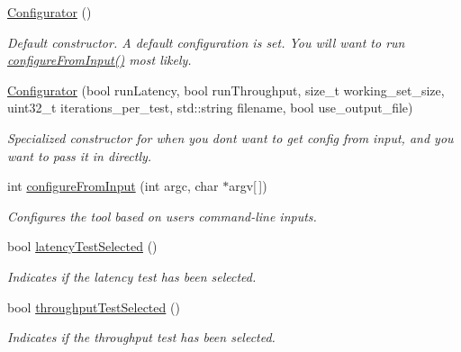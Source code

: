 \begin{DoxyCompactItemize}
\item 
\hypertarget{classxmem_1_1config_1_1_configurator_a8ae41e8976253affae2b905cb7ca2389}{}\hyperlink{classxmem_1_1config_1_1_configurator_a8ae41e8976253affae2b905cb7ca2389}{Configurator} ()\label{classxmem_1_1config_1_1_configurator_a8ae41e8976253affae2b905cb7ca2389}

\begin{DoxyCompactList}\small\item\em Default constructor. A default configuration is set. You will want to run \hyperlink{classxmem_1_1config_1_1_configurator_acd25216c6c3db19dd68a5f2ec9b0a061}{configure\+From\+Input()} most likely. \end{DoxyCompactList}\item 
\hyperlink{classxmem_1_1config_1_1_configurator_ab687c798957f36943f2af563fd67f402}{Configurator} (bool run\+Latency, bool run\+Throughput, size\+\_\+t working\+\_\+set\+\_\+size, uint32\+\_\+t iterations\+\_\+per\+\_\+test, std\+::string filename, bool use\+\_\+output\+\_\+file)
\begin{DoxyCompactList}\small\item\em Specialized constructor for when you don\textquotesingle{}t want to get config from input, and you want to pass it in directly. \end{DoxyCompactList}\item 
int \hyperlink{classxmem_1_1config_1_1_configurator_acd25216c6c3db19dd68a5f2ec9b0a061}{configure\+From\+Input} (int argc, char $\ast$argv\mbox{[}$\,$\mbox{]})
\begin{DoxyCompactList}\small\item\em Configures the tool based on user\textquotesingle{}s command-\/line inputs. \end{DoxyCompactList}\item 
bool \hyperlink{classxmem_1_1config_1_1_configurator_abb15795a835f9d17205d442120b720a9}{latency\+Test\+Selected} ()
\begin{DoxyCompactList}\small\item\em Indicates if the latency test has been selected. \end{DoxyCompactList}\item 
bool \hyperlink{classxmem_1_1config_1_1_configurator_a21bfd5b3c29b32223ea59e08aebcfe8c}{throughput\+Test\+Selected} ()
\begin{DoxyCompactList}\small\item\em Indicates if the throughput test has been selected. \end{DoxyCompactList}\item 

\end{DoxyCompactItemize}
